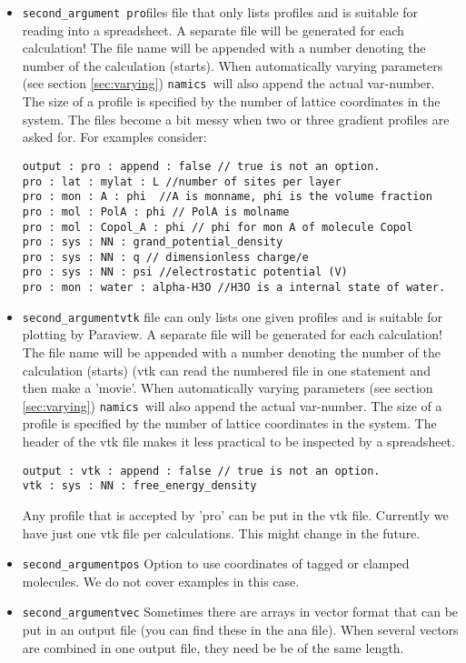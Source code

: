 \documentclass{article}
\newcommand{\namics}{{\tt namics}}
\begin{document}
\begin{itemize}
\item {\tt second\_argument }{\tt pro}files file that only lists profiles and is suitable  for reading into a spreadsheet.  A separate file will be generated  for each calculation!  The file name will be appended with a number  denoting the number of the calculation (starts).  When automatically varying  parameters (see section \ref{sec:varying}) \namics\ will also  append the actual var-number. The size of a profile is specified by the number of lattice coordinates in the system. The files become a bit messy when two or three gradient profiles are asked for. For examples consider:
\begin{verbatim}
output : pro : append : false // true is not an option.
pro : lat : mylat : L //number of sites per layer 
pro : mon : A : phi  //A is monname, phi is the volume fraction
pro : mol : PolA : phi // PolA is molname
pro : mol : Copol_A : phi // phi for mon A of molecule Copol 
pro : sys : NN : grand_potential_density
pro : sys : NN : q // dimensionless charge/e
pro : sys : NN : psi //electrostatic potential (V) 
pro : mon : water : alpha-H3O //H3O is a internal state of water. 
\end{verbatim}

\item {\tt second\_argument}{\tt vtk} file can only lists one given profiles and is suitable  for plotting by Paraview.  A separate file will be generated  for each calculation!  The file name will be appended with a number denoting the number of the calculation (starts) (vtk can read the numbered file in one statement and then make a 'movie'.  When automatically varying  parameters (see section \ref{sec:varying}) \namics\ will also  append the actual var-number. The size of a profile is specified by the number of lattice coordinates in the system. The header of the vtk file makes it less practical to be inspected by a spreadsheet. 

\begin{verbatim}
output : vtk : append : false // true is not an option.
vtk : sys : NN : free_energy_density
\end{verbatim}
Any profile that is accepted by 'pro' can be put in the vtk file. Currently we have just one vtk file per calculations. This might change in the future.

\item {\tt second\_argument}{\tt pos} Option to use coordinates of tagged or clamped molecules. We do not cover examples in this case. 

\item {\tt second\_argument}{\tt vec} Sometimes there are arrays in vector format that can be put in an output file (you can find these in the ana file). When several vectors are combined in one output file, they need be be of the same length. 

\end{itemize}
\end{document}
